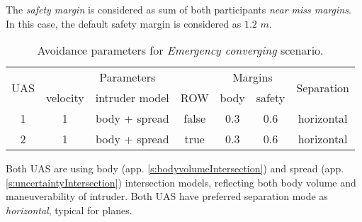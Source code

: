 The \emph{safety margin} is considered as sum of both participants \emph{near miss margins}. In this case, the default safety margin is considered as $1.2$ $m$.

\begin{table}[H]
    \centering
    \begin{tabular}{c||c|c|c||c|c||c}
        \multirow{2}{*}{UAS} & \multicolumn{3}{c||}{Parameters} & \multicolumn{2}{c||}{Margins} & \multirow{2}{*}{Separation}                                            \\\cline{2-6}
                             & velocity & intruder model & ROW        & body & safety \\\hline\hline
        1                    & 1        & body + spread  & false            & 0.3         & 0.6           & horizontal\\\hline
        2                    & 1        & body + spread  & true             & 0.3         & 0.6  & horizontal          \\
    \end{tabular}
    \caption{Avoidance parameters for  \emph{Emergency converging} scenario.}
    \label{tab:aboidanceParametersForEmergencyConvergingScenario}
\end{table}

\begin{note}
 Both UAS are using  body (app. \ref{s:bodyvolumeIntersection}) and spread (app. \ref{s:uncertaintyIntersection}) intersection models, reflecting both body volume and maneuverability  of intruder. Both UAS have preferred separation mode as \emph{horizontal}, typical for planes.
\end{note}

